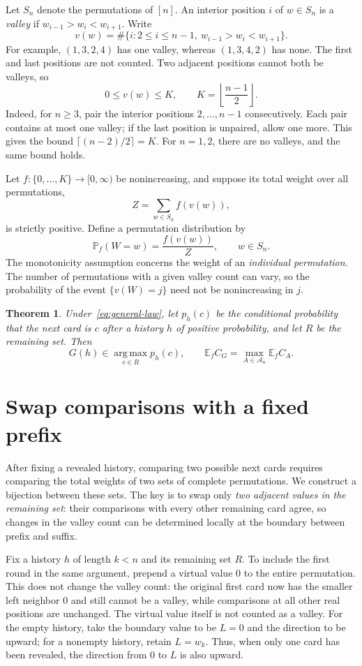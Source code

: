 \documentclass[10pt,a4paper]{amsart}
\numberwithin{equation}{section}
\newtheorem{theorem}{Theorem}[section]
\begin{document}
Let $S_n$ denote the permutations of $[n]$. An interior position $i$ of $w\in S_n$ is a \emph{valley} if $w_{i-1}>w_i<w_{i+1}$. Write
\[
 v(w)=\#\{i:2\le i\le n-1,\ w_{i-1}>w_i<w_{i+1}\}.
\]
For example, $(1,3,2,4)$ has one valley, whereas $(1,3,4,2)$ has none. The first and last positions are not counted. Two adjacent positions cannot both be valleys, so
\[
 0\le v(w)\le K,\qquad K=\left\lfloor\frac{n-1}{2}\right\rfloor.
\]
Indeed, for $n\ge3$, pair the interior positions $2,\ldots,n-1$ consecutively. Each pair contains at most one valley; if the last position is unpaired, allow one more. This gives the bound $\lceil(n-2)/2\rceil=K$. For $n=1,2$, there are no valleys, and the same bound holds.

Let $f:\{0,\ldots,K\}\to[0,\infty)$ be nonincreasing, and suppose its total weight over all permutations,
\[
 Z=\sum_{w\in S_n}f(v(w)),
\]
is strictly positive. Define a permutation distribution by
\begin{equation}\label{eq:general-law}
 \mathbb P_f(W=w)=\frac{f(v(w))}{Z},\qquad w\in S_n.
\end{equation}
The monotonicity assumption concerns the weight of an \emph{individual permutation}. The number of permutations with a given valley count can vary, so the probability of the event $\{v(W)=j\}$ need not be nonincreasing in $j$.

\begin{theorem}\label{thm:general}
Under~\eqref{eq:general-law}, let $p_h(c)$ be the conditional probability that the next card is $c$ after a history $h$ of positive probability, and let $R$ be the remaining set. Then
\[
G(h)\in\operatorname*{arg\,max}_{c\in R}p_h(c),
\qquad
\mathbb E_f C_G=\max_{A\in\mathcal A_n}\mathbb E_f C_A.
\]
\end{theorem}
\section{Swap comparisons with a fixed prefix}\label{sec:swap}
After fixing a revealed history, comparing two possible next cards requires comparing the total weights of two sets of complete permutations. We construct a bijection between these sets. The key is to swap only \emph{two adjacent values in the remaining set}: their comparisons with every other remaining card agree, so changes in the valley count can be determined locally at the boundary between prefix and suffix.

Fix a history $h$ of length $k<n$ and its remaining set $R$. To include the first round in the same argument, prepend a virtual value $0$ to the entire permutation. This does not change the valley count: the original first card now has the smaller left neighbor $0$ and still cannot be a valley, while comparisons at all other real positions are unchanged. The virtual value itself is not counted as a valley. For the empty history, take the boundary value to be $L=0$ and the direction to be upward; for a nonempty history, retain $L=w_k$. Thus, when only one card has been revealed, the direction from $0$ to $L$ is also upward.
\end{document}
